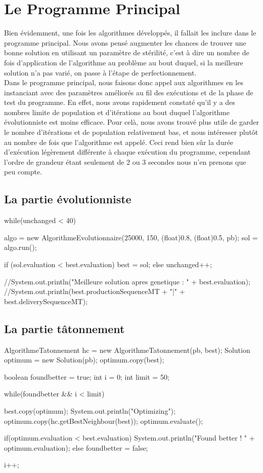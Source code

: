 \section{Le Programme Principal}
Bien évidemment, une fois les algorithmes développés, il fallait les inclure dans le programme principal. Nous avons pensé augmenter les chances de trouver une bonne solution en utilisant un paramètre de stérilité, c'est à dire un nombre de fois d'application de l'algorithme au problème au bout duquel, si la meilleure solution n'a pas varié, on passe à l'étape de perfectionnement.\\
Dans le programme principal, nous faisons donc appel aux algorithmes en les instanciant avec des paramètres améliorés au fil des exécutions et de la phase de test du programme. En effet, nous avons rapidement constaté qu'il y a des nombres limite de population et d'itérations au bout duquel l'algorithme évolutionniste est moins efficace. Pour celà, nous avons trouvé plus utile de garder le nombre d'itérations et de population relativement bas, et nous intéresser plutôt au nombre de fois que l'algorithme est appelé. Ceci rend bien sûr la durée d'exécution légèrement différente à chaque exécution du programme, cependant l'ordre de grandeur étant seulement de 2 ou 3 secondes nous n'en prenons que peu compte.

\subsection{La partie évolutionniste}

\begin{java}
while(unchanged < 40) {
	algo = new AlgorithmeEvolutionnaire(25000, 150, (float)0.8, (float)0.5, pb);
	sol = algo.run();
	
	if (sol.evaluation < best.evaluation)
		best = sol;
	else
		unchanged++;
}

//System.out.println("Meilleure solution apres genetique : " + best.evaluation);
//System.out.println(best.productionSequenceMT + "|" + best.deliverySequenceMT);
\end{java}

\vspace{1em}

\subsection{La partie tâtonnement}

\begin{java}
AlgorithmeTatonnement hc = new AlgorithmeTatonnement(pb, best);
Solution optimum = new Solution(pb);
optimum.copy(best);

boolean foundbetter = true;
int i = 0;
int limit = 50;

while(foundbetter && i < limit) {
	best.copy(optimum);
	System.out.println("Optimizing");
	optimum.copy(hc.getBestNeighbour(best));
	optimum.evaluate();
	
	if(optimum.evaluation < best.evaluation) {
		System.out.println("Found better ! " + optimum.evaluation);
	}
	else {
		foundbetter = false;
	}
	
	i++;
}
\end{java}

